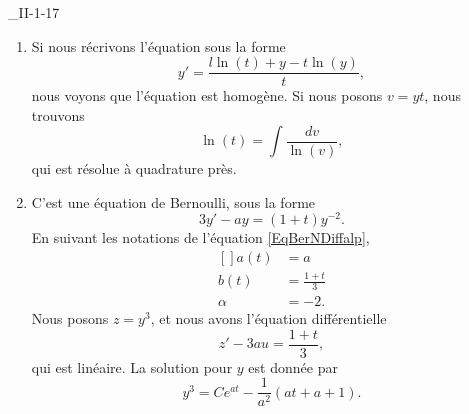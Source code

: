 

\begin{corrige}{_II-1-17}

	\begin{enumerate}

		\item
		      Si nous récrivons l'équation sous la forme
		      \begin{equation}
			      y'=\frac{ l\ln(t)+y-t\ln(y) }{ t },
		      \end{equation}
		      nous voyons que l'équation est homogène. Si nous posons $v=yt$, nous trouvons
		      \begin{equation}
			      \ln(t)=\int\frac{ dv }{ \ln(v) },
		      \end{equation}
		      qui est résolue à quadrature près.

		\item
		      C'est une équation de Bernoulli, sous la forme
		      \begin{equation}
			      3y'-ay=(1+t)y^{-2}.
		      \end{equation}
		      En suivant les notations de l'équation \eqref{EqBerNDiffalp},
		      \begin{equation}
			      \begin{aligned}[]
				      a(t)   & =a                 \\
				      b(t)   & =\frac{ 1+t }{ 3 } \\
				      \alpha & =-2.
			      \end{aligned}
		      \end{equation}
		      Nous posons $z=y^3$, et nous avons l'équation différentielle
		      \begin{equation}
			      z'-3au=\frac{ 1+t }{ 3 },
		      \end{equation}
		      qui est linéaire. La solution pour $y$ est donnée par
		      \begin{equation}
			      y^3=C e^{at}-\frac{1}{ a^2 }(at+a+1).
		      \end{equation}


\end{enumerate}
\end{corrige}
